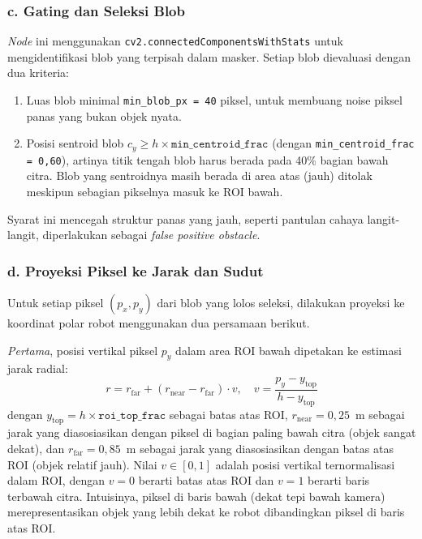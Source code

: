 \subsubsection*{c. Gating dan Seleksi Blob}

\textit{Node} ini menggunakan \texttt{cv2.connectedComponentsWithStats} untuk mengidentifikasi blob yang terpisah dalam masker. Setiap blob dievaluasi dengan dua kriteria:
\begin{enumerate}
    \item Luas blob minimal \texttt{min\_blob\_px = 40} piksel, untuk membuang noise piksel panas yang bukan objek nyata.
    \item Posisi sentroid blob $c_y \geq h \times \texttt{min\_centroid\_frac}$ (dengan \texttt{min\_centroid\_frac = 0,60}), artinya titik tengah blob harus berada pada 40\% bagian bawah citra. Blob yang sentroidnya masih berada di area atas (jauh) ditolak meskipun sebagian pikselnya masuk ke ROI bawah.
\end{enumerate}
Syarat ini mencegah struktur panas yang jauh, seperti pantulan cahaya langit-langit, diperlakukan sebagai \textit{false positive obstacle}.

\subsubsection*{d. Proyeksi Piksel ke Jarak dan Sudut}

Untuk setiap piksel $(p_x, p_y)$ dari blob yang lolos seleksi, dilakukan proyeksi ke koordinat polar robot menggunakan dua persamaan berikut.

\textit{Pertama}, posisi vertikal piksel $p_y$ dalam area ROI bawah dipetakan ke estimasi jarak radial:
\begin{equation}
    r = r_\text{far} + (r_\text{near} - r_\text{far}) \cdot v, \quad
    v = \frac{p_y - y_\text{top}}{h - y_\text{top}}
    \label{eq:range_projection}
\end{equation}
dengan $y_\text{top} = h \times \texttt{roi\_top\_frac}$ sebagai batas atas ROI, $r_\text{near} = 0{,}25$~m sebagai jarak yang diasosiasikan dengan piksel di bagian paling bawah citra (objek sangat dekat), dan $r_\text{far} = 0{,}85$~m sebagai jarak yang diasosiasikan dengan batas atas ROI (objek relatif jauh). Nilai $v \in [0, 1]$ adalah posisi vertikal ternormalisasi dalam ROI, dengan $v=0$ berarti batas atas ROI dan $v=1$ berarti baris terbawah citra. Intuisinya, piksel di baris bawah (dekat tepi bawah kamera) merepresentasikan objek yang lebih dekat ke robot dibandingkan piksel di baris atas ROI.

